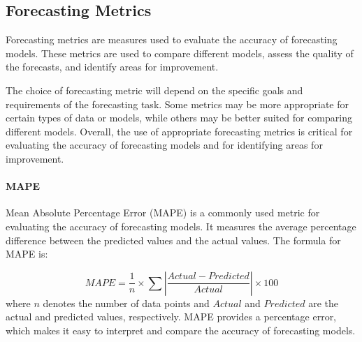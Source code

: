   
  \subsection{Forecasting Metrics}
  \label{sec:forecasting-metrics-evaluation-setup}

    Forecasting metrics \cite{botchkarevPerformanceMetricsError2018} are measures used to evaluate the accuracy of forecasting models. These metrics are used to compare different models, assess the quality of the forecasts, and identify areas for improvement.





    The choice of forecasting metric will depend on the specific goals and requirements of the forecasting task. Some metrics may be more appropriate for certain types of data or models, while others may be better suited for comparing different models.
    Overall, the use of appropriate forecasting metrics is critical for evaluating the accuracy of forecasting models and for identifying areas for improvement.

    \paragraph{MAPE}
    \label{par:mape-metrics-evaluation}
      Mean Absolute Percentage Error (MAPE) \cite{demyttenaereMeanAbsolutePercentage2016} is a commonly used metric for evaluating the accuracy of forecasting models. It measures the average percentage difference between the predicted values and the actual values.
      The formula for MAPE is:

      $$MAPE = \frac{1}{n} \times \sum \left|\frac{Actual - Predicted}{Actual}\right| \times 100$$
      where $n$ denotes the number of data points and $Actual$ and $Predicted$ are the actual and predicted values, respectively.
      MAPE provides a percentage error, which makes it easy to interpret and compare the accuracy of forecasting models. 
      
